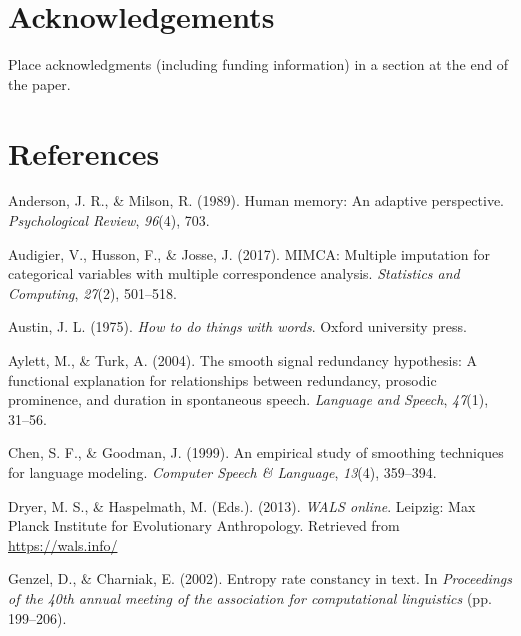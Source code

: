 \documentclass[10pt, letterpaper]{article}
\begin{document}
\hypertarget{acknowledgements}{%
\section{Acknowledgements}\label{acknowledgements}}

Place acknowledgments (including funding information) in a section at
the end of the paper.

\hypertarget{references}{%
\section{References}\label{references}}

\setlength{\parindent}{-0.1in} 
\setlength{\leftskip}{0.125in}

\noindent

\hypertarget{refs}{}
\leavevmode\hypertarget{ref-anderson1989}{}%
Anderson, J. R., \& Milson, R. (1989). Human memory: An adaptive
perspective. \emph{Psychological Review}, \emph{96}(4), 703.

\leavevmode\hypertarget{ref-audigier2017}{}%
Audigier, V., Husson, F., \& Josse, J. (2017). MIMCA: Multiple
imputation for categorical variables with multiple correspondence
analysis. \emph{Statistics and Computing}, \emph{27}(2), 501--518.

\leavevmode\hypertarget{ref-austin1975}{}%
Austin, J. L. (1975). \emph{How to do things with words}. Oxford
university press.

\leavevmode\hypertarget{ref-aylett2004}{}%
Aylett, M., \& Turk, A. (2004). The smooth signal redundancy hypothesis:
A functional explanation for relationships between redundancy, prosodic
prominence, and duration in spontaneous speech. \emph{Language and
Speech}, \emph{47}(1), 31--56.

\leavevmode\hypertarget{ref-chen1999empirical}{}%
Chen, S. F., \& Goodman, J. (1999). An empirical study of smoothing
techniques for language modeling. \emph{Computer Speech \& Language},
\emph{13}(4), 359--394.

\leavevmode\hypertarget{ref-wals}{}%
Dryer, M. S., \& Haspelmath, M. (Eds.). (2013). \emph{WALS online}.
Leipzig: Max Planck Institute for Evolutionary Anthropology. Retrieved
from \url{https://wals.info/}

\leavevmode\hypertarget{ref-genzel2002}{}%
Genzel, D., \& Charniak, E. (2002). Entropy rate constancy in text. In
\emph{Proceedings of the 40th annual meeting of the association for
computational linguistics} (pp. 199--206).
\end{document}
